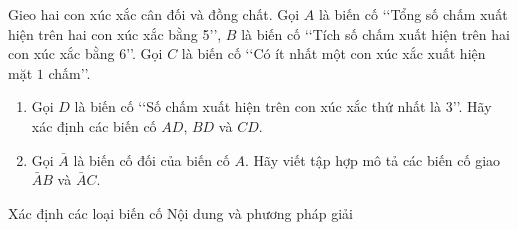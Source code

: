 \begin{bt}%
	Gieo hai con xúc xắc cân đối và đồng chất. Gọi $A$ là biến cố \lq\lq  Tổng số chấm xuất hiện trên hai con xúc xắc bằng 5\rq\rq, $B$ là biến cố \lq\lq  Tích số chấm xuất hiện trên hai con xúc xắc bằng 6\rq\rq. Gọi $C$ là biến cố \lq\lq  Có ít nhất một con xúc xắc xuất hiện mặt $1$ chấm\rq\rq.
	\begin{enumerate}
		\item  Gọi $D$ là biến cố \lq\lq  Số chấm xuất hiện trên con xúc xắc thứ nhất là 3\rq\rq. Hãy xác định các biến cố $AD$, $BD$ và $CD$.
		\item Gọi $\bar{A}$ là biến cố đối của biến cố $A$. Hãy viết tập hợp mô tả các biến cố giao $\bar{A}B$ và $\bar{A}C$.
	\end{enumerate}
\end{bt}

\begin{dang}{Xác định các loại biến cố}%
	Nội dung và phương pháp giải
\end{dang}
